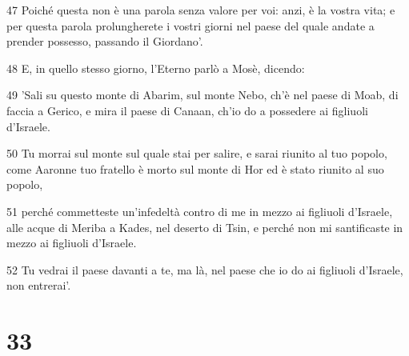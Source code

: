 \par 47 Poiché questa non è una parola senza valore per voi: anzi, è la vostra vita; e per questa parola prolungherete i vostri giorni nel paese del quale andate a prender possesso, passando il Giordano'.
\par 48 E, in quello stesso giorno, l'Eterno parlò a Mosè, dicendo:
\par 49 'Sali su questo monte di Abarim, sul monte Nebo, ch'è nel paese di Moab, di faccia a Gerico, e mira il paese di Canaan, ch'io do a possedere ai figliuoli d'Israele.
\par 50 Tu morrai sul monte sul quale stai per salire, e sarai riunito al tuo popolo, come Aaronne tuo fratello è morto sul monte di Hor ed è stato riunito al suo popolo,
\par 51 perché commetteste un'infedeltà contro di me in mezzo ai figliuoli d'Israele, alle acque di Meriba a Kades, nel deserto di Tsin, e perché non mi santificaste in mezzo ai figliuoli d'Israele.
\par 52 Tu vedrai il paese davanti a te, ma là, nel paese che io do ai figliuoli d'Israele, non entrerai'.

\chapter{33}

